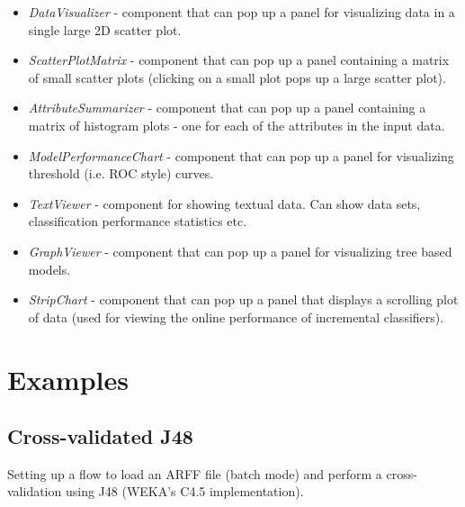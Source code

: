 \documentclass[a4paper]{article}
\begin{document}
\begin{itemize}
	\item \textit{DataVisualizer} - component that can pop up a panel for 
	visualizing data in a single large 2D scatter plot.
	\item \textit{ScatterPlotMatrix} - component that can pop up a panel 
	containing a matrix of small scatter plots (clicking on a small plot 
	pops up a large scatter plot).
	\item \textit{AttributeSummarizer} - component that can pop up a panel 
	containing a matrix of histogram plots - one for each of the attributes 
	in the input data.
	\item \textit{ModelPerformanceChart} - component that can pop up a 
	panel for visualizing threshold (i.e. ROC style) curves.
	\item \textit{TextViewer} - component for showing textual data. Can show 
	data sets, classification performance statistics etc.
	\item \textit{GraphViewer} - component that can pop up a panel for 
	visualizing tree based models.
	\item \textit{StripChart} - component that can pop up a panel that displays 
	a scrolling plot of data (used for viewing the online performance of 
	incremental classifiers).
\end{itemize}


\newpage
\section{Examples}


\subsection{Cross-validated J48}
Setting up a flow to load an ARFF file (batch mode) and
perform a cross-validation using J48 (WEKA's C4.5 implementation).

\begin{center}
\end{center}
\end{document}
